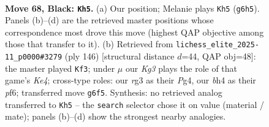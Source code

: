 \documentclass[11pt]{article}
\begin{document}
\clearpage

\begin{figure}[p]\centering
\begin{subfigure}{0.46\textwidth}\centering
\resizebox{\linewidth}{!}{%
\newchessgame
\chessboard[
  setfen={8/8/1R4kr/8/r5bB/6R1/2n2P2/7K b - - 16 68},
  showmover=false,
  pgfstyle=straightmove, color=movearrow, markmove={g6-h5}
]}
\caption{}
\end{subfigure}\hfill
\begin{subfigure}{0.46\textwidth}\centering
\resizebox{\linewidth}{!}{%
\newchessgame
\chessboard[
  setfen={8/5k2/5p2/8/1r2KRPN/8/8/8 w - - 1 74},
  showmover=false,
  pgfstyle=straightmove, color=movearrow, markmove={e4-f3}
]}
\caption{}
\end{subfigure}
\\[4pt]

\caption{\textbf{Move 68, Black: \texttt{Kh5}.} (a) Our position; Melanie plays \texttt{Kh5} (\texttt{g6h5}). Panels (b)--(d) are the retrieved master positions whose correspondence most drove this move (highest QAP objective among those that transfer to it). (b) Retrieved from \texttt{lichess\_elite\_2025-11\_p0000\#3279} (ply 146) [structural distance $d$=44, QAP obj=48]: the master played \texttt{Kf3}; under $\mu$ our \emph{Kg3} plays the role of that game's \emph{Ke4}; cross-type roles: our \emph{r}g3 as their \emph{P}g4, our \emph{b}h4 as their \emph{p}f6; transferred move \texttt{g6f5}. Synthesis: no retrieved analog transferred to \texttt{Kh5} -- the \texttt{search} selector chose it on value (material / mate); panels (b)--(d) show the strongest nearby analogies.}
\label{fig:thought-m135}
\end{figure}

\clearpage
\end{document}
